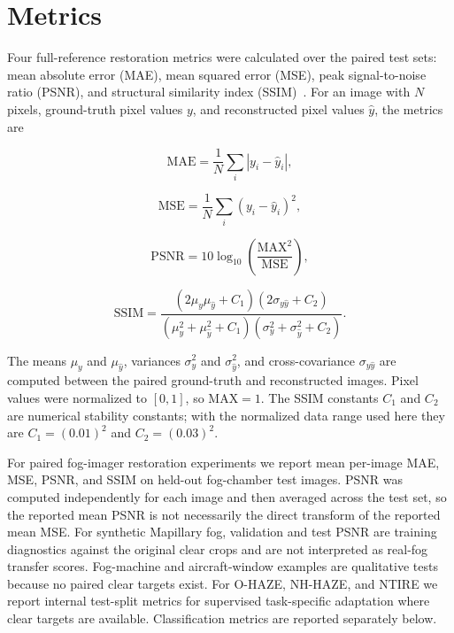\documentclass[9pt]{osa-supplemental-document}
\begin{document}
\section{Metrics}
\label{secS:metrics}

Four full-reference restoration metrics were calculated over the paired test sets: mean absolute error (MAE), mean squared error (MSE), peak signal-to-noise ratio (PSNR), and structural similarity index (SSIM)~\cite{wang2004ssim}. For an image with $N$ pixels, ground-truth pixel values $y$, and reconstructed pixel values $\hat{y}$, the metrics are

\begin{equation}
\mathrm{MAE} = \frac{1}{N} \sum_i \left| y_i - \hat{y}_i \right| ,
\label{eqS:mae}
\end{equation}

\begin{equation}
\mathrm{MSE} = \frac{1}{N} \sum_i \left( y_i - \hat{y}_i \right)^2 ,
\label{eqS:mse}
\end{equation}

\begin{equation}
\mathrm{PSNR} = 10 \log_{10} \left( \frac{\mathrm{MAX}^2}{\mathrm{MSE}} \right) ,
\label{eqS:psnr}
\end{equation}

\begin{equation}
\mathrm{SSIM} =
\frac{(2\mu_y \mu_{\hat{y}} + C_1)(2\sigma_{y\hat{y}} + C_2)}
{(\mu_y^2 + \mu_{\hat{y}}^2 + C_1)(\sigma_y^2 + \sigma_{\hat{y}}^2 + C_2)} .
\label{eqS:ssim}
\end{equation}

The means $\mu_y$ and $\mu_{\hat{y}}$, variances $\sigma_y^2$ and $\sigma_{\hat{y}}^2$, and cross-covariance $\sigma_{y\hat{y}}$ are computed between the paired ground-truth and reconstructed images. Pixel values were normalized to $[0,1]$, so $\mathrm{MAX}=1$. The SSIM constants $C_1$ and $C_2$ are numerical stability constants; with the normalized data range used here they are $C_1=(0.01)^2$ and $C_2=(0.03)^2$.

For paired fog-imager restoration experiments we report mean per-image MAE, MSE, PSNR, and SSIM on held-out fog-chamber test images. PSNR was computed independently for each image and then averaged across the test set, so the reported mean PSNR is not necessarily the direct transform of the reported mean MSE. For synthetic Mapillary fog, validation and test PSNR are training diagnostics against the original clear crops and are not interpreted as real-fog transfer scores. Fog-machine and aircraft-window examples are qualitative tests because no paired clear targets exist. For O-HAZE, NH-HAZE, and NTIRE we report internal test-split metrics for supervised task-specific adaptation where clear targets are available. Classification metrics are reported separately below.
\end{document}
